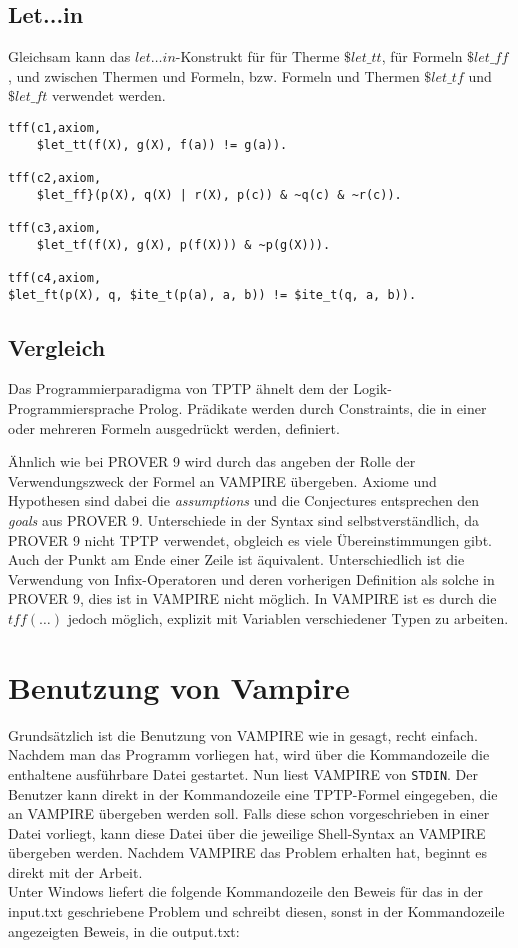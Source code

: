 \documentclass{article}
\begin{document}
\subsection{Let...in}
\label{subsec:tptpletin}

Gleichsam kann das $let\dots in$-Konstrukt für für Therme $\$let\_tt$, für Formeln $\$let\_ff$, und zwischen Thermen und Formeln, bzw. Formeln und Thermen $\$let\_tf$ und $\$let\_ft$ verwendet werden.
\begin{lstlisting}[language=tptp]
tff(c1,axiom,
	$let_tt(f(X), g(X), f(a)) != g(a)).

tff(c2,axiom,
	$let_ff}(p(X), q(X) | r(X), p(c)) & ~q(c) & ~r(c)).

tff(c3,axiom,
	$let_tf(f(X), g(X), p(f(X))) & ~p(g(X))).

tff(c4,axiom,
$let_ft(p(X), q, $ite_t(p(a), a, b)) != $ite_t(q, a, b)).
\end{lstlisting}
\subsection{Vergleich}
\label{subsec:tptpcomp}
Das Programmierparadigma von TPTP ähnelt dem der Logik-Programmiersprache Prolog.
Prädikate werden durch Constraints, die in einer oder mehreren Formeln ausgedrückt werden, definiert.

Ähnlich wie bei PROVER 9 wird durch das angeben der Rolle der Verwendungszweck der Formel an VAMPIRE übergeben. Axiome und Hypothesen sind dabei die \textit{assumptions} und die Conjectures entsprechen den \textit{goals} aus PROVER 9.
Unterschiede in der Syntax sind selbstverständlich, da PROVER 9 nicht TPTP verwendet, obgleich es viele Übereinstimmungen gibt.
Auch der Punkt am Ende einer Zeile ist äquivalent. Unterschiedlich ist die Verwendung von Infix-Operatoren und deren vorherigen Definition als solche in PROVER 9, 
dies ist in VAMPIRE nicht möglich. In VAMPIRE ist es durch die $tff(\dots)$ jedoch möglich, explizit mit Variablen verschiedener Typen zu arbeiten.\cite{cav2013, prover9manual} 


\section{Benutzung von Vampire}
\label{sec:invocation}

Grundsätzlich ist die Benutzung von VAMPIRE wie in \cite{cav2013} gesagt, recht einfach. Nachdem man das Programm vorliegen hat, wird über die Kommandozeile die enthaltene ausführbare Datei gestartet. Nun liest VAMPIRE von \texttt{STDIN}. Der Benutzer kann direkt in der Kommandozeile eine TPTP-Formel eingegeben, die an VAMPIRE übergeben werden soll. Falls diese schon vorgeschrieben in einer Datei vorliegt, kann diese Datei über die jeweilige Shell-Syntax an VAMPIRE übergeben werden. Nachdem VAMPIRE das Problem erhalten hat, beginnt es direkt mit der Arbeit.\\
Unter Windows liefert die folgende Kommandozeile den Beweis für das in der input.txt geschriebene Problem und schreibt diesen, sonst in der Kommandozeile angezeigten Beweis, in die output.txt:\\
\end{document}
